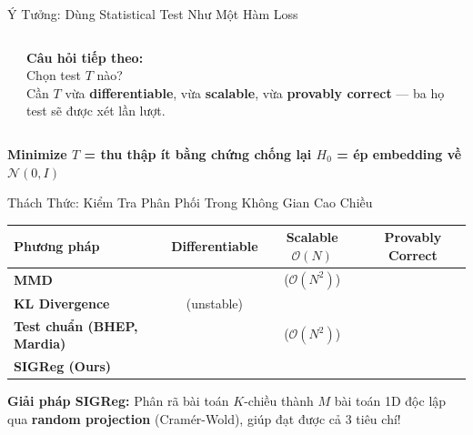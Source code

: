 \documentclass[aspectratio=169,9pt]{beamer}
\newcommand{\cmark}{\ding{51}}
\newcommand{\xmark}{\ding{55}}
\newcommand{\takeaway}[1]{%
  \vfill
  \begin{mdframed}[
    linecolor=maccent, linewidth=1.5pt,
    backgroundcolor=mlightgold,
    innertopmargin=5pt, innerbottommargin=5pt,
    innerleftmargin=10pt, innerrightmargin=10pt,
    roundcorner=3pt, skipabove=4pt, skipbelow=0pt
  ]
  \centering\small\bfseries\color{mprimary} #1
  \end{mdframed}%
}
\begin{document}
\begin{frame}{Ý Tưởng: Dùng Statistical Test Như Một Hàm Loss}
\begin{columns}[T]
\begin{center}
\end{center}


\begin{goodbox}
\footnotesize \textbf{Câu hỏi tiếp theo:}\\[4pt]
Chọn test $T$ nào?\\[4pt]
Cần $T$ vừa \textbf{differentiable}, vừa \textbf{scalable}, vừa \textbf{provably correct} — ba họ test sẽ được xét lần lượt.
\end{goodbox}

\end{columns}

\takeaway{Minimize $T$ = thu thập ít bằng chứng chống lại $H_0$ = ép embedding về $\mathcal{N}(0,I)$}

\end{frame}


\begin{frame}{Thách Thức: Kiểm Tra Phân Phối Trong Không Gian Cao Chiều}

\vspace{1em}
\begin{center}
\renewcommand{\arraystretch}{1.8}
\begin{tabular}{@{} l c c c @{}}
\toprule
\textbf{Phương pháp} & \textbf{Differentiable} & \textbf{Scalable} $\mathcal{O}(N)$ & \textbf{Provably Correct} \\
\midrule
\textbf{MMD} & \textcolor{mgood}{\cmark} & \textcolor{mbad}{\xmark} \footnotesize ($\mathcal{O}(N^2)$) & \textcolor{mgood}{\cmark} \\
\textbf{KL Divergence} & \textcolor{mbad}{\xmark} \footnotesize (unstable) & \textcolor{mgood}{\cmark} & \textcolor{mgood}{\cmark} \\
\textbf{Test chuẩn (BHEP, Mardia)} & \textcolor{mgood}{\cmark} & \textcolor{mbad}{\xmark} \footnotesize ($\mathcal{O}(N^2)$) & \textcolor{mgood}{\cmark} \\
\midrule
\rowcolor{mgood!15}
\textbf{SIGReg (Ours)} & \textcolor{mgood}{\textbf{\cmark}} & \textcolor{mgood}{\textbf{\cmark}} & \textcolor{mgood}{\textbf{\cmark}} \\
\bottomrule
\end{tabular}
\end{center}

\vspace{1.5em}
\begin{accentbox}
\footnotesize \textbf{Giải pháp SIGReg:} Phân rã bài toán $K$-chiều thành $M$ bài toán 1D độc lập qua \textbf{random projection} (Cramér-Wold), giúp đạt được cả 3 tiêu chí!
\end{accentbox}

\end{frame}
\end{document}
